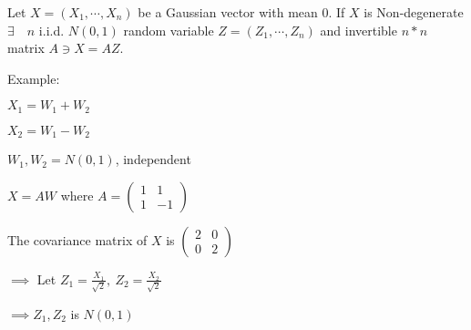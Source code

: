 \begin{prop*}
	Let $X = (X_1,\cdots,X_n)$ be a Gaussian vector with mean $0$. If $X$ is Non-degenerate $\exists \quad n$ i.i.d. $N(0,1)$ random variable $Z = (Z_1,\cdots,Z_n)$ and invertible $n*n$ matrix $A \ni X = AZ$.
\end{prop*}

Example:

$X_1 = W_1 + W_2$

$X_2 = W_1 - W_2$

$W_1,W_2 = N(0,1)$, independent

$X = AW$ where $A =
\left(\begin{matrix}
1 & 1 \\ 1 & -1
\end{matrix}\right)$

The covariance matrix of $X$ is 
$\left(\begin{matrix}
2 & 0 \\ 0 & 2
\end{matrix}\right)$

$\implies$ Let $Z_1 = \frac{X_1}{\sqrt{2}},~Z_2 = \frac{X_2}{\sqrt{2}}$

$\implies Z_1,Z_2$ is $N(0,1)$

